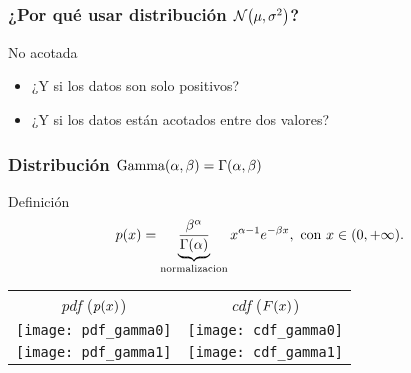 \documentclass[table]{beamer}
\begin{document}
\begin{frame}
    \frametitle{¿Por qué usar distribución $\normal{\mu}{\sigma^{2}}$?}
    \begin{block}{No acotada}
        \begin{itemize}
            \item ¿Y si los datos son solo positivos?
            \item ¿Y si los datos están acotados entre dos valores?
        \end{itemize}
    \end{block}
\end{frame}



\begin{frame}
    \frametitle{Distribución $\text{Gamma} \parens{\alpha, \beta} = \gammadist{\alpha}{\beta}$}
    \begin{block}{Definición}
        \begin{equation*}
            \pdf{x} = \underbrace{\frac{\beta^{\alpha}}{\gammafunc{\alpha}}}_{\text{normalizacion}} x^{\alpha - 1} e^{- \beta x} ,
            \text{ con } x \in \parens{0, + \infty} .
        \end{equation*}
    \end{block}
    \begin{center}
        \begin{tabular}{cc}
            \emph{pdf} ($\pdf{x}$) & \emph{cdf} ($\FF{x}$) \\
            \texttt{[image: pdf\_gamma0]} &
            \texttt{[image: cdf\_gamma0]} \\
            \texttt{[image: pdf\_gamma1]} &
            \texttt{[image: cdf\_gamma1]}
        \end{tabular}
    \end{center}
\end{frame}
\end{document}
